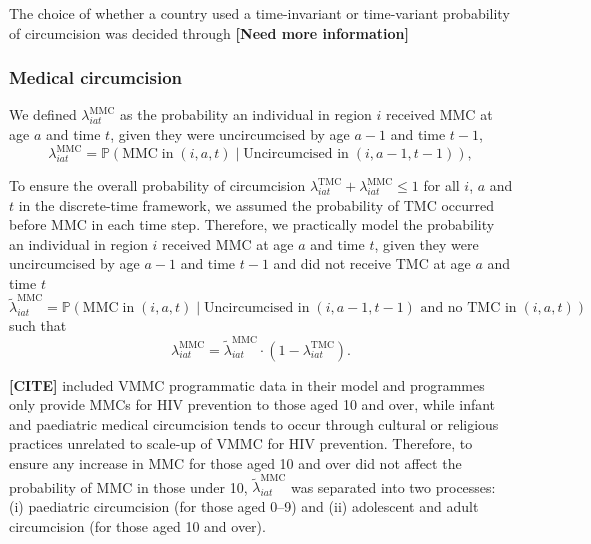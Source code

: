 \documentclass{article}
\begin{document}
\begin{appendix}
The choice of whether a country used a time-invariant or time-variant probability of circumcision was decided through {\color{red}\bf[Need more information]}


\subsubsection*{Medical circumcision}


\noindent We defined $\lambda^{\text{MMC}}_{iat}$ as the probability an individual in region $i$ received MMC at age $a$ and time $t$, given they were uncircumcised by age $a-1$ and time $t-1$,  
\begin{equation}
		\lambda^{\text{MMC}}_{iat} = \mathbb{P}(\text{MMC} \; \text{in} \; (i,a,t) \; | \; \text{Uncircumcised in} \; (i,a-1, t-1)),
	\label{eqn::mmc}
\end{equation}

To ensure the overall probability of circumcision $\lambda^{\text{TMC}}_{iat} + \lambda^{\text{MMC}}_{iat} \leq 1$ for all $i$, $a$ and $t$ in the discrete-time framework, we assumed the probability of TMC occurred before MMC in each time step. Therefore, we practically model the probability an individual in region $i$ received MMC at age $a$ and time $t$, given they were uncircumcised by age $a-1$ and time $t-1$ and did not receive TMC at age $a$ and time $t$
\begin{equation*}
		\tilde{\lambda}^{\text{MMC}}_{iat} = \mathbb{P}(\text{MMC} \; \text{in} \; (i,a,t) \; | \; \text{Uncircumcised in} \; (i,a-1, t-1) \text{ and no TMC in} \; (i,a, t))
\end{equation*}
such that
\begin{equation*}
		\lambda^{\text{MMC}}_{iat} = \tilde{\lambda}^{\text{MMC}}_{iat}\cdot (1-\lambda^{\text{TMC}}_{iat}).
\end{equation*}

{\color{red}\bf[CITE]} included VMMC programmatic data in their model and programmes only provide MMCs for HIV prevention to those aged 10 and over, while infant and paediatric medical circumcision tends to occur through cultural or religious practices unrelated to scale-up of VMMC for HIV prevention. Therefore, to ensure any increase in MMC for those aged 10 and over did not affect the probability of MMC in those under 10, $\tilde{\lambda}^{\text{MMC}}_{iat}$ was separated into two processes: (i) paediatric circumcision (for those aged 0--9) and (ii) adolescent and adult circumcision (for those aged 10 and over). 


\end{appendix}
\end{document}
